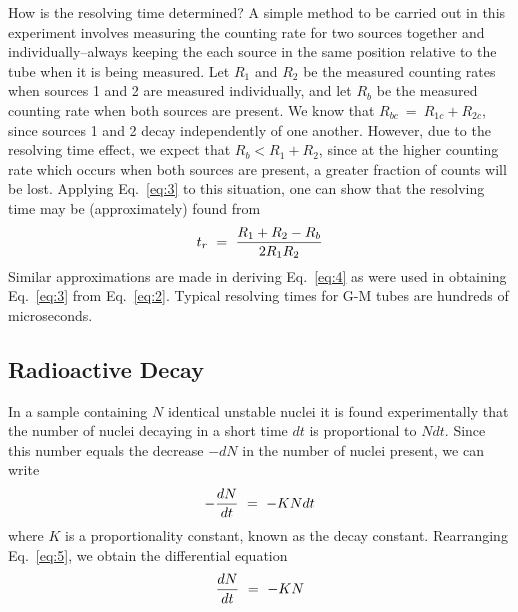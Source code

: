 How is the resolving time determined?  A simple method to be carried out in this
experiment involves measuring the counting rate for two sources together and
individually--always keeping the each source in the same position relative to
the tube when it is being measured.  Let $R_{1}$ and $R_{2}$ be the measured
counting rates when sources 1 and 2 are measured individually, and let $R_{b}$
be the measured counting rate when both sources are present. We know that
$R_{bc} ~=~ R_{1c} + R_{2c }$, since sources 1 and 2 decay independently of one
another.  However, due to the resolving time effect, we expect that $R_{b} <
R_{1} + R_{2}$, since at the higher counting rate which occurs when both sources
are present, a greater fraction of counts will be lost.  Applying Eq.~\ref{eq:3}
to this situation, one can show that the resolving time may be (approximately)
found from
\begin{equation}
t_r ~=~ { R_1 + R_2 - R_b \over 2 R_1 R_2 }
\label{eq:4}
\end{equation}
Similar approximations are made in deriving Eq.~\ref{eq:4} as were used in
obtaining Eq.~\ref{eq:3} from Eq.~\ref{eq:2}.  Typical resolving times for G-M tubes
are hundreds of microseconds.

\subsection{Radioactive Decay}
\label{sec:rad-decay}

In a sample containing $N$ identical unstable nuclei it is found
experimentally that the number of nuclei decaying in a short time $dt$ is
proportional to $N dt$.  Since this number equals the decrease $-dN$
in the number of nuclei present, we can write
\begin{equation}
- {dN \over dt} ~=~ -K N dt
\label{eq:5}
\end{equation}
where $K$ is a proportionality constant, known as the decay constant.
Rearranging Eq.~\ref{eq:5}, we obtain the differential equation
\begin{equation}
{dN \over dt} ~=~ -K N
\label{eq:6}
\end{equation}

